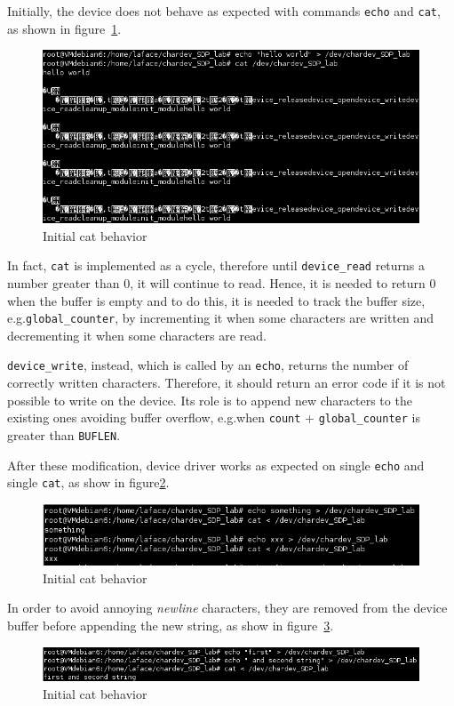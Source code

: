 \documentclass{report}
\begin{document}
Initially, the device does not behave as expected with commands \texttt{echo} and \texttt{cat}, as shown in figure~\ref{img:test_cat_01}.

\begin{figure}[hbtp]
\centering
\includegraphics[scale=0.4]{images/es02/test_cat_01.png}
\caption{Initial cat behavior}
\label{img:test_cat_01}
\end{figure}

In fact, \texttt{cat} is implemented as a cycle, therefore until \texttt{device\_read} returns a number greater than 0, it will continue to read. Hence, it is needed to return 0 when the buffer is empty and to do this, it is needed to track the buffer size, e.g.\@ \texttt{global\_counter}, by incrementing it when some characters are written and decrementing it when some characters are read.

\texttt{device\_write}, instead, which is called by an \texttt{echo}, returns the number of correctly written characters. Therefore, it should return an error code if it is not possible to write on the device. Its role is to append new characters to the existing ones avoiding buffer overflow, e.g.\@ when \texttt{count} + \texttt{global\_counter} is greater than \texttt{BUFLEN}. 

After these modification, device driver works as expected on single \texttt{echo} and single \texttt{cat}, as show in figure\ref{img:echo_ok}.

\begin{figure}[hbtp]
\centering
\includegraphics[scale=0.4]{images/es02/echo_ok.png}
\caption{Initial cat behavior}
\label{img:echo_ok}
\end{figure}

In order to avoid annoying \emph{newline} characters, they are removed from the device buffer before appending the new string, as show in figure~\ref{img:echo_multiline_ok}.

\begin{figure}[hbtp]
\centering
\includegraphics[scale=0.4]{images/es02/echo_multiline_ok.png}
\caption{Initial cat behavior}
\label{img:echo_multiline_ok}
\end{figure}
\end{document}
